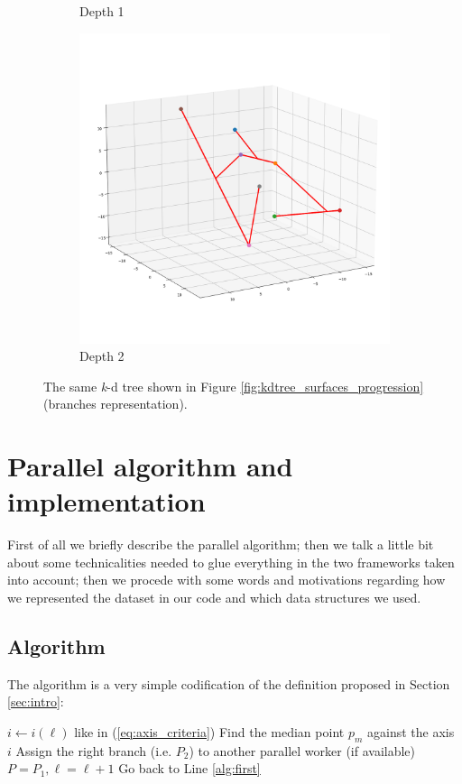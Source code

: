 \documentclass{article}
\newcommand{\kdtree}{\emph{k}-d tree}
\begin{document}
\begin{figure}[t!]
{\begin{subfigure}{.4\textwidth}
            \caption{Depth 1}
            \end{subfigure}
        \hfill
        \begin{subfigure}{.4\textwidth}
            \centering
            \includegraphics[width=\linewidth]{kd_tree_progress_img2_branches.png}
            \caption{Depth 2}
        \end{subfigure}
    }
    \caption{The same \kdtree{} shown in Figure \ref{fig:kdtree_surfaces_progression} (branches representation).}
    \label{fig:kdtree_branches_progression}
\end{figure}

\section{Parallel algorithm and implementation} \label{sec:algorithm}
First of all we briefly describe the parallel algorithm; then we talk a little
bit about some technicalities needed to glue everything in the two frameworks
taken into account; then we procede with some words and motivations regarding
how we represented the dataset in our code and which data structures we used.

\subsection{Algorithm}
The algorithm is a very simple codification of the definition proposed in
Section \ref{sec:intro}:
\begin{algorithm}
    \SetAlgoLined
    \caption{Parallel \kdtree{} growth}\label{alg:parallel_algorithm}
    $i \gets i(\ell)$ like in (\ref{eq:axis_criteria})\; \label{alg:first}
    Find the median point $p_m$ against the axis $i$\;
    Assign the right branch (i.e. $P_2$) to another parallel worker (if available)\;
    $P = P_1, \ell = \ell + 1$\;
    Go back to Line \ref{alg:first}\;
\end{algorithm}
\end{document}
